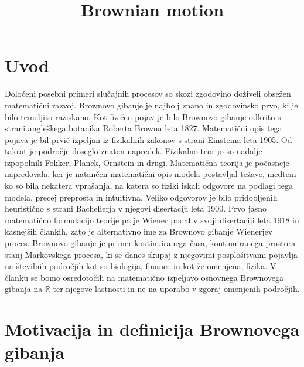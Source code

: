 \documentclass[twoside,11pt]{article}
\begin{document}



\klasifikacija{~} 
\title{Brownian motion}
\abstract{}

\glava\baselineskip=14.5pt

\smallskip

\section{Uvod}

Določeni posebni primeri slučajnih procesov so skozi zgodovino doživeli obsežen
matematični razvoj. Brownovo gibanje je najbolj znano in zgodovinsko prvo, ki je bilo 
temeljito raziskano. Kot fizičen pojav je
bilo Brownovo gibanje odkrito s strani angleškega botanika Roberta Browna leta 1827.
Matematični opis tega pojava je bil prvič izpeljan iz fizikalnih zakonov s strani 
Einsteina leta 1905. Od takrat je področje doseglo znaten napredek. Fizikalno teorijo 
so nadalje izpopolnili Fokker, Planck, Ornstein in drugi. Matematična 
teorija je počasneje napredovala, ker je natančen matematični opis modela postavljal 
težave, medtem ko so bila nekatera vprašanja, na katera so fiziki iskali odgovore na
podlagi tega modela, precej preprosta in intuitivna. Veliko odgovorov je bilo
pridobljenih heuristično s strani Bachelierja v njegovi disertaciji leta 1900.
Prvo jasno matematično formulacijo teorije pa je Wiener podal v svoji
disertaciji leta 1918 in kasnejših člankih, zato je alternativno ime za 
Brownovo gibanje Wienerjev proces. Brownovo gibanje je primer kontinuiranega 
časa, kontinuiranega prostora stanj Markovskega procesa, ki se danes skupaj z 
njegovimi posplošitvami pojavlja na številnih področjih kot so biologija, finance in kot
že omenjena, fizika. V članku se bomo
osredotočili na matematično izpeljavo osnovnega Brownovega gibanja na $\mathbb{R}$ 
ter njegove lastnosti in ne na uporabo v zgoraj omenjenih področjih.




\pagebreak
\section{Motivacija in definicija Brownovega gibanja}
\end{document}
